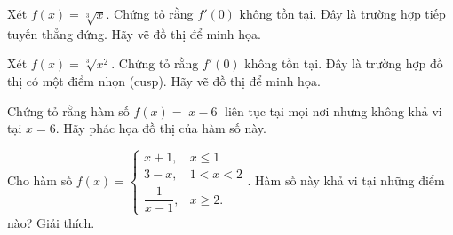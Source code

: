 \begin{exercise}
Xét $f(x) = \sqrt[3]{x}$. Chứng tỏ rằng $f'(0)$ không tồn tại. Đây là trường hợp tiếp tuyến thẳng đứng. Hãy vẽ đồ thị để minh họa.
\end{exercise}

\begin{exercise}
Xét $f(x) = \sqrt[3]{x^2}$. Chứng tỏ rằng $f'(0)$ không tồn tại. Đây là trường hợp đồ thị có một điểm nhọn (cusp). Hãy vẽ đồ thị để minh họa.
\end{exercise}

\begin{exercise}
Chứng tỏ rằng hàm số $f(x) = |x-6|$ liên tục tại mọi nơi nhưng không khả vi tại $x=6$. Hãy phác họa đồ thị của hàm số này.
\end{exercise}

\begin{exercise}
Cho hàm số $f(x) = \begin{cases} x+1, & x \le 1 \\ 3-x, & 1 < x < 2 \\ \dfrac{1}{x-1}, & x \ge 2. \end{cases}$. Hàm số này khả vi tại những điểm nào? Giải thích.
\end{exercise}